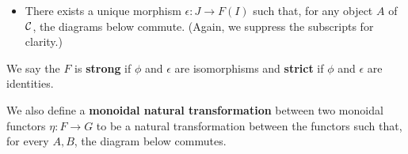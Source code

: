 \begin{definition}
\begin{itemize}
        \item There exists a unique morphism $\epsilon: J \to F(I)$ such that, for any object $A$ of $\mathcal{C}$, 
        the diagrams below commute. (Again, 
        we suppress the subscripts for clarity.)
        \begin{center}  
        \end{center}
    \end{itemize}
    We say the $F$ is 
    \textbf{strong} if $\phi$ and $\epsilon$ are isomorphisms and
    \textbf{strict} if $\phi$ and $\epsilon$ are identities.
    

    We also define a \textbf{monoidal natural transformation} between two monoidal
    functors $\eta: F \to G$ to be a natural transformation between the functors 
    such that, for every $A, B$, the diagram below commutes. 
    \begin{center}
    \end{center}
\end{definition}

